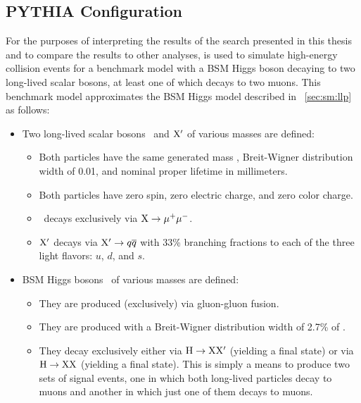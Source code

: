 \subsection{PYTHIA Configuration}
\label{sec:sm:pythia}
For the purposes of interpreting the results of the search presented in this thesis and to compare the results to other analyses,  \cite{Sjostrand:2014zea,Khachatryan:2015pea} is used to simulate high-energy collision events for a benchmark model with a BSM Higgs boson decaying to two long-lived scalar bosons, at least one of which decays to two muons.
This benchmark model approximates the BSM Higgs model described in \Sec~\ref{sec:sm:llp} as follows:
\begin{itemize}
  \item Two long-lived scalar bosons \PLLP\ and $\mathrm{X}^\prime$ of various masses \mX are defined:
    \begin{itemize}
      \item Both particles have the same generated mass \mX, Breit-Wigner distribution width of 0.01\GeV, and nominal proper lifetime \cTau in millimeters.
      \item Both particles have zero spin, zero electric charge, and zero color charge.
      \item \PLLP\ decays exclusively via $\mathrm{X} \to \mu^+\mu^-$.
      \item $\mathrm{X}^\prime$ decays via $\mathrm{X}^\prime \to q\overline{q}$ with 33\% branching fractions to each of the three light flavors: $u$, $d$, and $s$.
    \end{itemize}
  \item BSM Higgs bosons \PHiggs\ of various masses \mH are defined:
    \begin{itemize}
      \item They are produced (exclusively) via gluon-gluon fusion.
      \item They are produced with a Breit-Wigner distribution width of 2.7\% of \mH.
      \item They decay exclusively either via $\mathrm{H} \to \mathrm{X}\mathrm{X}^\prime$ (yielding a \twoMu final state) or via $\mathrm{H} \to \mathrm{X}\mathrm{X}$ (yielding a \fourMu final state). This is simply a means to produce two sets of signal events, one in which both long-lived particles decay to muons and another in which just one of them decays to muons.
    \end{itemize}
\end{itemize}

